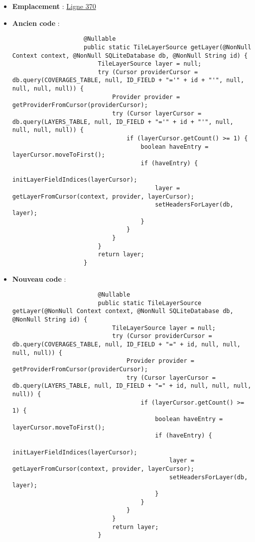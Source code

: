 \begin{enumerate}
\begin{itemize}
              \item \textbf{Emplacement} :
                    \href{https://github.com/MarcusWolschon/osmeditor4android/blob/master/src/main/java/de/blau/android/resources/TileLayerDatabase.java#L370}{Ligne 370}
              \item \textbf{Ancien code} :
                    \begin{verbatim}
                    @Nullable
                    public static TileLayerSource getLayer(@NonNull Context context, @NonNull SQLiteDatabase db, @NonNull String id) {
                        TileLayerSource layer = null;
                        try (Cursor providerCursor = db.query(COVERAGES_TABLE, null, ID_FIELD + "='" + id + "'", null, null, null, null)) {
                            Provider provider = getProviderFromCursor(providerCursor);
                            try (Cursor layerCursor = db.query(LAYERS_TABLE, null, ID_FIELD + "='" + id + "'", null, null, null, null)) {
                                if (layerCursor.getCount() >= 1) {
                                    boolean haveEntry = layerCursor.moveToFirst();
                                    if (haveEntry) {
                                        initLayerFieldIndices(layerCursor);
                                        layer = getLayerFromCursor(context, provider, layerCursor);
                                        setHeadersForLayer(db, layer);
                                    }
                                }
                            }
                        }
                        return layer;
                    }
                    \end{verbatim}
              \item \textbf{Nouveau code} :
                    \begin{verbatim}
                        @Nullable
                        public static TileLayerSource getLayer(@NonNull Context context, @NonNull SQLiteDatabase db, @NonNull String id) {
                            TileLayerSource layer = null;
                            try (Cursor providerCursor = db.query(COVERAGES_TABLE, null, ID_FIELD + "=" + id, null, null, null, null)) {
                                Provider provider = getProviderFromCursor(providerCursor);
                                try (Cursor layerCursor = db.query(LAYERS_TABLE, null, ID_FIELD + "=" + id, null, null, null, null)) {
                                    if (layerCursor.getCount() >= 1) {
                                        boolean haveEntry = layerCursor.moveToFirst();
                                        if (haveEntry) {
                                            initLayerFieldIndices(layerCursor);
                                            layer = getLayerFromCursor(context, provider, layerCursor);
                                            setHeadersForLayer(db, layer);
                                        }
                                    }
                                }
                            }
                            return layer;
                        }
                    \end{verbatim}
          \end{itemize}


\end{enumerate}
